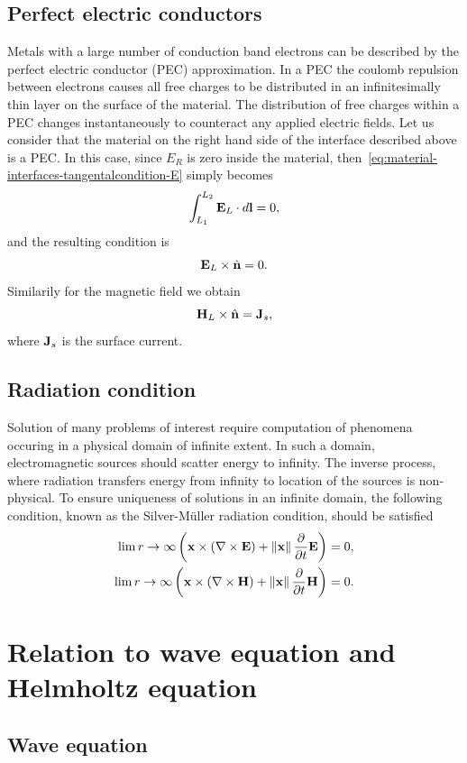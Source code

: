 \subsection{Perfect electric conductors}
Metals with a large number of conduction band electrons can be described by the
perfect electric conductor (PEC) approximation. In a PEC the coulomb repulsion
between electrons causes all free charges to be distributed in an
infinitesimally thin layer on the surface of the material. The distribution of
free charges within a PEC changes instantaneously to counteract any applied
electric fields. Let us consider that the material on the right hand side of the
interface described above is a PEC. In this case, since $E_R$ is zero inside the
material, then~\eqref{eq:material-interfaces-tangentalcondition-E} simply
becomes
$$
\int_{L_1}^{L_2} \mathbf{E}_L \cdot d\mathbf{l} = 0 ,
$$
and the resulting condition is
$$
\mathbf{E}_L \times \hat{\mathbf{n}} = 0 .
$$
Similarily for the magnetic field we obtain
$$
\mathbf{H}_L \times \hat{\mathbf{n}} = \mathbf{J}_s ,
$$
where $\mathbf{J}_s$ is the surface current.

\subsection{Radiation condition}
Solution of many problems of interest require computation of phenomena occuring
in a physical domain of infinite extent. In such a domain, electromagnetic
sources should scatter energy to infinity. The inverse process, where radiation
transfers energy from infinity to location of the sources is non-physical. To
ensure uniqueness of solutions in an infinite domain, the following condition,
known as the Silver-M\"uller radiation condition, should be satisfied
\begin{align}
  \lim{ r \to \infty } \left( \mathbf{x} \times \left( \nabla \times \mathbf{E} \right) + \left\lVert\mathbf{x}\right\rVert \frac{\partial}{\partial t} \mathbf{E} \right) = 0, \\
  \lim{ r \to \infty } \left( \mathbf{x} \times \left( \nabla \times \mathbf{H} \right) + \left\lVert\mathbf{x}\right\rVert \frac{\partial}{\partial t} \mathbf{H} \right) = 0.
\end{align}

\section{Relation to wave equation and Helmholtz equation}
\subsection{Wave equation}

